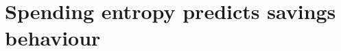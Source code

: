 
\chapter{Spending entropy predicts savings behaviour}%
\label{cha:entropy}




\begin{subappendices}

\end{subappendices}
